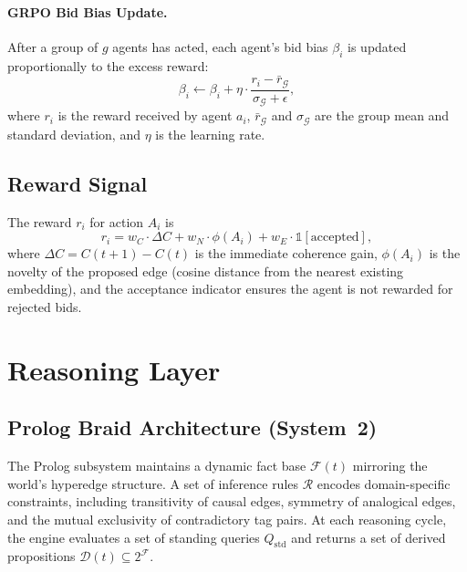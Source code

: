 \documentclass[11pt]{article}
\begin{document}
\paragraph{GRPO Bid Bias Update.}
After a group of $g$ agents has acted, each agent's bid bias $\beta_i$ is
updated proportionally to the excess reward:
\begin{equation}
  \beta_i \leftarrow \beta_i + \eta \cdot \frac{r_i - \bar{r}_{\mathcal{G}}}
                                                {\sigma_{\mathcal{G}} + \epsilon},
  \label{eq:grpo}
\end{equation}
where $r_i$ is the reward received by agent $a_i$, $\bar{r}_{\mathcal{G}}$ and
$\sigma_{\mathcal{G}}$ are the group mean and standard deviation, and $\eta$ is
the learning rate.

\subsection{Reward Signal}

The reward $r_i$ for action $A_i$ is
\begin{equation}
  r_i = w_C \cdot \Delta C + w_N \cdot \phi(A_i) + w_E \cdot \mathbb{1}[\text{accepted}],
  \label{eq:reward}
\end{equation}
where $\Delta C = C(t{+}1) - C(t)$ is the immediate coherence gain, $\phi(A_i)$
is the novelty of the proposed edge (cosine distance from the nearest existing
embedding), and the acceptance indicator ensures the agent is not rewarded for
rejected bids.

\section{Reasoning Layer}
\label{sec:reasoning}

\subsection{Prolog Braid Architecture (System~2)}

The Prolog subsystem maintains a dynamic fact base $\mathcal{F}(t)$ mirroring
the world's hyperedge structure. A set of inference rules $\mathcal{R}$ encodes
domain-specific constraints, including transitivity of causal edges, symmetry of
analogical edges, and the mutual exclusivity of contradictory tag pairs. At each
reasoning cycle, the engine evaluates a set of standing queries $Q_{\text{std}}$
and returns a set of derived propositions $\mathcal{D}(t) \subseteq 2^{\mathcal{F}}$.
\end{document}
